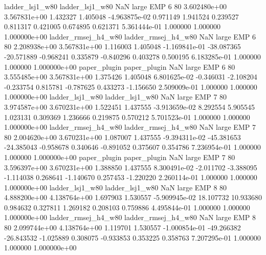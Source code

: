     ladder_lsj1_w80     ladder_lsj1_w80                   NaN      large      EMP                 6 80 3.602480e+00   3.567831e+00      1.432327       1.405048 -4.963875e-02      0.971149      1.941524     0.239527       0.811317  0.421005   0.674895     0.621371   5.361444e-01            1.000000        1.000000        1.000000e+00
ladder_rmsej_h4_w80 ladder_rmsej_h4_w80                   NaN      large      EMP                 6 80 2.208938e+00   3.567831e+00      1.116003       1.405048 -1.169841e-01    -38.087365    -20.571889    -0.968241       0.335879 -0.840296   0.403278     0.500195   6.183285e-01            1.000000        1.000000        1.000000e+00
       paper_plugin        paper_plugin                   NaN      large      EMP                 6 80 3.555485e+00   3.567831e+00      1.375426       1.405048  6.801625e-02     -0.346031     -2.108204    -0.233754       0.815781 -0.787625   0.433273    -1.156650   2.509009e-01            1.000000        1.000000        1.000000e+00
    ladder_lsj1_w80     ladder_lsj1_w80                   NaN      large      EMP                 7 80 3.974587e+00   3.670231e+00      1.522451       1.437555 -3.913659e-02      8.292554      5.905545     1.023131       0.309369  1.236666   0.219875     0.570212   5.701523e-01            1.000000        1.000000        1.000000e+00
ladder_rmsej_h4_w80 ladder_rmsej_h4_w80                   NaN      large      EMP                 7 80 2.004620e+00   3.670231e+00      1.087007       1.437555 -9.394311e-02    -45.381653    -24.385043    -0.958678       0.340646 -0.891052   0.375607     0.354786   7.236954e-01            1.000000        1.000000        1.000000e+00
       paper_plugin        paper_plugin                   NaN      large      EMP                 7 80 3.596397e+00   3.670231e+00      1.388850       1.437555  8.300491e-02     -2.011702     -3.388095    -1.114038       0.268641 -1.140670   0.257453    -1.220220   2.260114e-01            1.000000        1.000000        1.000000e+00
    ladder_lsj1_w80     ladder_lsj1_w80                   NaN      large      EMP                 8 80 4.888200e+00   4.138764e+00      1.697903       1.530557 -5.909945e-02     18.107732     10.933680     0.984632       0.327811  1.269182   0.208103     0.759886   4.495844e-01            1.000000        1.000000        1.000000e+00
ladder_rmsej_h4_w80 ladder_rmsej_h4_w80                   NaN      large      EMP                 8 80 2.099744e+00   4.138764e+00      1.119701       1.530557 -1.000854e-01    -49.266382    -26.843532    -1.025889       0.308075 -0.933853   0.353225     0.358763   7.207295e-01            1.000000        1.000000        1.000000e+00
